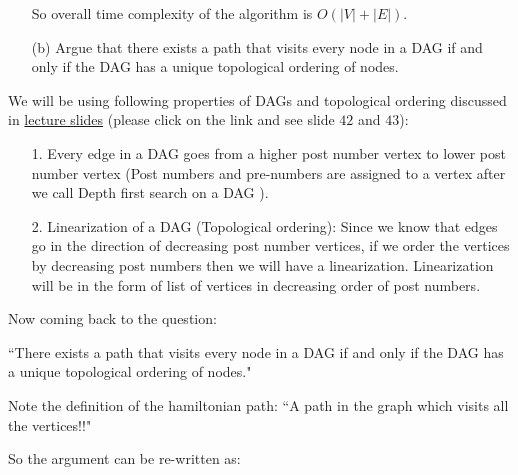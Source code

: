\documentclass[answers]{exam}
\begin{document}
\begin{questions}
\begin{enumerate}
\begin{solution}
So overall time complexity of the algorithm is $O(|V|+|E|)$.
\end{solution}
\item[(b)] Argue that there exists a path that visits every node in a DAG if and only if the DAG has a unique topological ordering of nodes.
\end{enumerate}

\begin{solution}
    

\begin{comment}
    We will be using following definition of topological order:\par

For a DAG with $n$ vertices, $(v_1,v_2,v_3,v_4,......v_{n-1},v_n)$ is a valid topological ordering if we have no edge of the form $(v_i,v_j)$ such that $i>j$ in the DAG.\par


Now coming back to the question, we have to prove that:

\end{comment}

We will be using following properties of DAGs and topological ordering discussed in \href{https://www.cse.iitd.ac.in/%7Erjaiswal/Teaching/2024/COL702/Slides/Week-02/DFS.pdf}{lecture slides} (please click on the link and see slide $42$ and $43$):
\begin{enumerate}
    \item [1.] Every edge in a DAG goes from a higher post
number vertex to lower post number vertex (Post numbers and pre-numbers are assigned to a vertex after we call Depth first search on a DAG  ).
\item [2.] Linearization of a DAG (Topological ordering): Since we know that edges go in the direction of decreasing post number vertices, if we order the vertices by decreasing post numbers then we will have a linearization. Linearization will be in the form of list of vertices in decreasing order of post numbers.
\end{enumerate}

Now coming back to the question:\par

``There exists a path that visits every node in a DAG if and only if the DAG has a unique topological ordering of nodes."

Note the definition of the hamiltonian path: ``A path in the graph which visits all the vertices!!"

So the argument can be re-written as:


\end{solution}
\end{questions}
\end{document}

